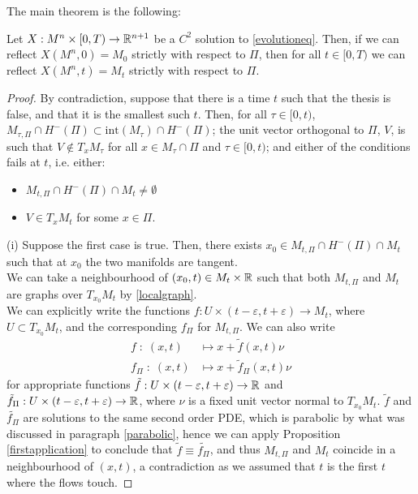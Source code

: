 The main theorem is the following: 

\begin{theorem}[Chow]
	Let $X:M^n\times [0,T) \rightarrow \mathbb{R}^{n+1}$ be a $C^2$ solution to \ref{evolutioneq}. Then, if we can reflect $X(M^n, 0)=M_0$ strictly with respect to $\Pi$, then for all $t\in [0,T)$ we can reflect $X(M^n, t)=M_t$ strictly with respect to $\Pi$. \label{reflection} 
\end{theorem}

\begin{proof}
	By contradiction, suppose that there is a time $t$ such that the thesis is false, and that it is the smallest such $t$. Then, for all $\tau \in [0,t)$, $M_{\tau,\Pi}\cap H^-(\Pi)\subset \mathrm{int}(M_{\tau})\cap H^-(\Pi)$; the unit vector orthogonal to $\Pi$, $V$, is such that $V\notin T_xM_\tau$ for all $x\in M_\tau\cap \Pi$ and $\tau \in [0,t)$; and either of the conditions fails at $t$, i.e. either: 
	\begin{itemize}
		\item[(i)] $M_{t,\Pi}\cap H^-(\Pi)\cap M_{t}\neq \emptyset$
		\item[(ii)] $V\in T_xM_t$  for some $x\in\Pi$. 
	\end{itemize} 

	(i) Suppose the first case is true. Then, there exists $x_0 \in M_{t,\Pi}\cap H^-(\Pi)\cap M_{t}$ such that at $x_0$ the two manifolds are tangent. \\
	We can take a neighbourhood of $(x_0, t)\in M_{t}\times \mathbb{R}$ such that  both $M_{t,\Pi}$ and $M_{t}$ are graphs over $T_{x_0}M_{t}$ by \ref{localgraph}. \\
	We can explicitly write the functions $f:U\times (t-\varepsilon, t+\varepsilon)\rightarrow M_t$, where $U\subset T_{x_0}M_{t}$, and the corresponding $f_\Pi$ for $M_{t,\Pi}$. 
	We can also write 
	\begin{align*}
		f \; : \; (x, t) &\mapsto x+\tilde{f}(x, t)\nu \\
		f_\Pi \; : \; (x, t) &\mapsto x+\tilde{f}_\Pi(x, t)\nu 
	\end{align*}
	for appropriate functions $\tilde{f}:U\times (t-\varepsilon, t+\varepsilon)\rightarrow \mathbb{R}$ and $\tilde{f}_\Pi:U\times (t-\varepsilon, t+\varepsilon)\rightarrow \mathbb{R}$, where $\nu$ is a fixed unit vector normal to $T_{x_0}M_{t}$.  $\tilde{f}$ and $\tilde{f_\Pi}$ are solutions to the same second order PDE, which is parabolic by what was discussed in paragraph \ref{parabolic}, hence we can apply Proposition \ref{firstapplication} to conclude that $\tilde{f}\equiv\tilde{f_\Pi}$, and thus $M_{t,\Pi}$ and $M_{t}$ coincide in a neighbourhood of $(x, t)$, a contradiction as we assumed that $t$ is the first $t$ where the flows touch.
	

\end{proof}
